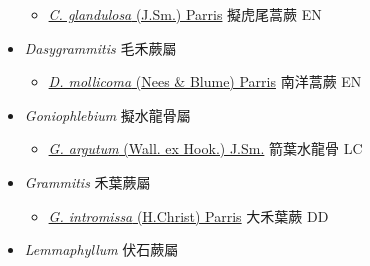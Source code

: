 \begin{itemize}
  \begin{itemize}
        \item[] \href{http://www.theplantlist.org/tpl1.1/search?q=Chrysogrammitis+glandulosa}{\textit{C. glandulosa} (J.Sm.) Parris}     擬虎尾蒿蕨 EN
  \end{itemize}
 \item[] \textit{Dasygrammitis} 毛禾蕨屬
                    
  \begin{itemize}
        \item[] \href{http://www.theplantlist.org/tpl1.1/search?q=Dasygrammitis+mollicoma}{\textit{D. mollicoma} (Nees \& Blume) Parris}     南洋蒿蕨 EN
  \end{itemize}
 \item[] \textit{Goniophlebium} 擬水龍骨屬
                    
  \begin{itemize}
        \item[] \href{http://www.theplantlist.org/tpl1.1/search?q=Goniophlebium+argutum}{\textit{G. argutum} (Wall. ex Hook.) J.Sm.}     箭葉水龍骨 LC
  \end{itemize}
 \item[] \textit{Grammitis} 禾葉蕨屬
                    
  \begin{itemize}
        \item[] \href{http://www.theplantlist.org/tpl1.1/search?q=Grammitis+intromissa}{\textit{G. intromissa} (H.Christ) Parris}   大禾葉蕨 DD
  \end{itemize}
 \item[] \textit{Lemmaphyllum} 伏石蕨屬
                    

\end{itemize}
